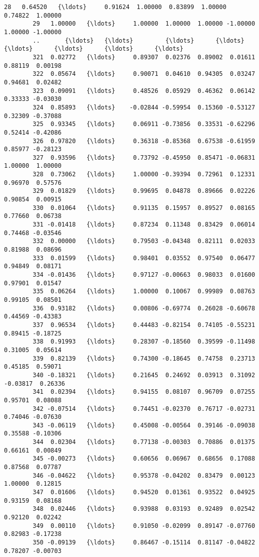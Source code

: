 \documentclass[11pt]{article}
\begin{document}
\begin{Verbatim}[commandchars=\\\{\}]
        28   0.64520   {\ldots}     0.91624  1.00000  0.83899  1.00000  0.74822  1.00000   
        29   1.00000   {\ldots}     1.00000  1.00000  1.00000 -1.00000  1.00000 -1.00000   
        ..       {\ldots}   {\ldots}         {\ldots}      {\ldots}      {\ldots}      {\ldots}      {\ldots}      {\ldots}   
        321  0.02772   {\ldots}     0.89307  0.02376  0.89002  0.01611  0.88119  0.00198   
        322  0.05674   {\ldots}     0.90071  0.04610  0.94305  0.03247  0.94681  0.02482   
        323  0.09091   {\ldots}     0.48526  0.05929  0.46362  0.06142  0.33333 -0.03030   
        324  0.85893   {\ldots}    -0.02844 -0.59954  0.15360 -0.53127  0.32309 -0.37088   
        325  0.93345   {\ldots}     0.06911 -0.73856  0.33531 -0.62296  0.52414 -0.42086   
        326  0.97820   {\ldots}     0.36318 -0.85368  0.67538 -0.61959  0.85977 -0.28123   
        327  0.93596   {\ldots}     0.73792 -0.45950  0.85471 -0.06831  1.00000  1.00000   
        328  0.73062   {\ldots}     1.00000 -0.39394  0.72961  0.12331  0.96970  0.57576   
        329  0.01829   {\ldots}     0.99695  0.04878  0.89666  0.02226  0.90854  0.00915   
        330  0.01064   {\ldots}     0.91135  0.15957  0.89527  0.08165  0.77660  0.06738   
        331 -0.01418   {\ldots}     0.87234  0.11348  0.83429  0.06014  0.74468 -0.03546   
        332  0.00000   {\ldots}     0.79503 -0.04348  0.82111  0.02033  0.81988  0.08696   
        333  0.01599   {\ldots}     0.98401  0.03552  0.97540  0.06477  0.94849  0.08171   
        334 -0.01436   {\ldots}     0.97127 -0.00663  0.98033  0.01600  0.97901  0.01547   
        335  0.06264   {\ldots}     1.00000  0.10067  0.99989  0.08763  0.99105  0.08501   
        336  0.93182   {\ldots}     0.00806 -0.69774  0.26028 -0.60678  0.44569 -0.43383   
        337  0.96534   {\ldots}     0.44483 -0.82154  0.74105 -0.55231  0.89415 -0.18725   
        338  0.91993   {\ldots}     0.28307 -0.18560  0.39599 -0.11498  0.31005  0.05614   
        339  0.82139   {\ldots}     0.74300 -0.18645  0.74758  0.23713  0.45185  0.59071   
        340 -0.18321   {\ldots}     0.21645  0.24692  0.03913  0.31092 -0.03817  0.26336   
        341  0.02394   {\ldots}     0.94155  0.08107  0.96709  0.07255  0.95701  0.08088   
        342 -0.07514   {\ldots}     0.74451 -0.02370  0.76717 -0.02731  0.74046 -0.07630   
        343 -0.06119   {\ldots}     0.45008 -0.00564  0.39146 -0.09038  0.35588 -0.10306   
        344  0.02304   {\ldots}     0.77138 -0.00303  0.70886  0.01375  0.66161  0.00849   
        345 -0.00273   {\ldots}     0.60656  0.06967  0.68656  0.17088  0.87568  0.07787   
        346 -0.04622   {\ldots}     0.95378 -0.04202  0.83479  0.00123  1.00000  0.12815   
        347  0.01606   {\ldots}     0.94520  0.01361  0.93522  0.04925  0.93159  0.08168   
        348  0.02446   {\ldots}     0.93988  0.03193  0.92489  0.02542  0.92120  0.02242   
        349  0.00110   {\ldots}     0.91050 -0.02099  0.89147 -0.07760  0.82983 -0.17238   
        350 -0.09139   {\ldots}     0.86467 -0.15114  0.81147 -0.04822  0.78207 -0.00703   
        

\end{Verbatim}
\end{document}
